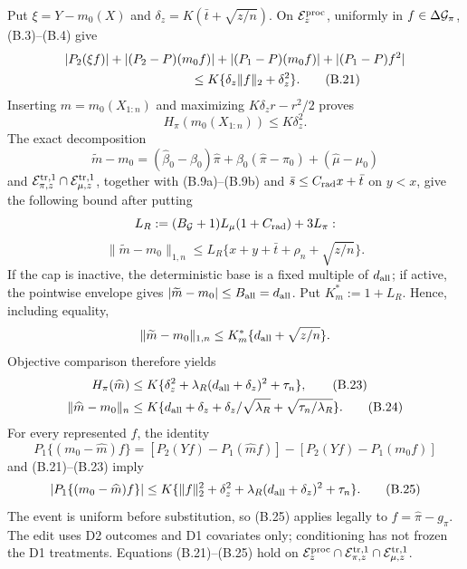 Put \(\xi=Y-m_0(X)\) and
\(\delta_z=K(\bar t+\sqrt{z/n})\).  On
\(\mathcal E_z^{\rm proc}\), uniformly in
\(f\in\Delta\mathcal G_\pi\), (B.3)--(B.4) give
\begin{align}
 &\abs{P_2(\xi f)}+\abs{(P_2-P)(m_0f)}
 +\abs{(P_1-P)(m_0f)}+\abs{(P_1-P)f^2}\nonumber\\
 &\hspace{35mm}\le K\{\delta_z\norm f_2+\delta_z^2\}.
 \tag{B.21}
\end{align}
Inserting \(m=m_0(X_{1:n})\) and maximizing
\(K\delta_zr-r^2/2\) proves
\begin{equation}
 H_\pi(m_0(X_{1:n}))\le K\delta_z^2.
 \tag{B.22}
\end{equation}
The exact decomposition
\[
 \widetilde m-m_0=(\widehat\beta_0-\beta_0)\widehat\pi
 +\beta_0(\widehat\pi-\pi_0)+(\widehat\mu-\mu_0)
\]
and \(\mathcal E_{\pi,z}^{\rm tr,1}\cap
\mathcal E_{\mu,z}^{\rm tr,1}\), together with (B.9a)--(B.9b) and
\(\bar s\le C_{\rm rad}x+\bar t\) on \(y<x\), give the following bound after
putting
\[
 L_R:=(B_{\mathcal G}+1)L_\mu(1+C_{\rm rad})+3L_\pi:
\]
\[
 \|\widetilde m-m_0\|_{1,n}
 \le L_R\{x+y+\bar t+\rho_n+\sqrt{z/n}\}.
\]
If the cap is inactive, the deterministic base is a fixed multiple of
\(d_{\rm all}\); if active, the pointwise envelope gives
\(\lvert \widetilde m-m_0\rvert\le B_{\rm all}=d_{\rm all}\).  Put
\(K_m^*:=1+L_R\).  Hence, including equality,
\[
 \|\widetilde m-m_0\|_{1,n}\le K_m^*\{d_{\rm all}+\sqrt{z/n}\}.
\]
Objective comparison therefore yields
\begin{align}
 H_\pi(\widehat m)&\le K\{\delta_z^2+
 \lambda_R(d_{\rm all}+\delta_z)^2+\tau_n\},\tag{B.23}\\
 \lVert \widehat m-m_0\rVert_n&\le K\{d_{\rm all}+\delta_z+
 \delta_z/\sqrt{\lambda_R}+\sqrt{\tau_n/\lambda_R}\}.
 \tag{B.24}
\end{align}
For every represented \(f\), the identity
\[
 P_1\{(m_0-\widehat m)f\}
 =[P_2(Yf)-P_1(\widehat mf)]-[P_2(Yf)-P_1(m_0f)]
\]
and (B.21)--(B.23) imply
\begin{equation}
 \lvert P_1\{(m_0-\widehat m)f\}\rvert
 \le K\{\lVert f\rVert_2^2+\delta_z^2+
 \lambda_R(d_{\rm all}+\delta_z)^2+\tau_n\}.
 \tag{B.25}
\end{equation}
The event is uniform before substitution, so (B.25) applies legally to
\(f=\widehat\pi-g_\pi\).  The edit uses D2 outcomes and D1 covariates only;
conditioning has not frozen the D1 treatments.
Equations (B.21)--(B.25) hold on
\(\mathcal E_z^{\rm proc}\cap\mathcal E_{\pi,z}^{\rm tr,1}\cap
\mathcal E_{\mu,z}^{\rm tr,1}\).

